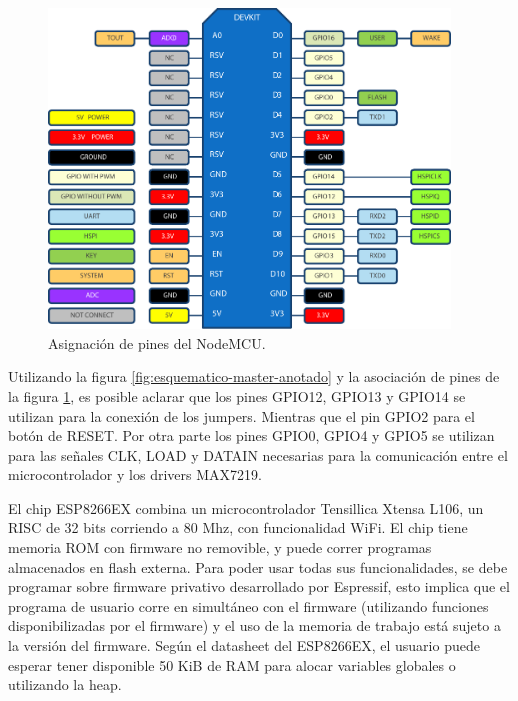 \begin{figure}[ht!]
	\begin{center}
		\includegraphics[width=0.95\textwidth]{imagenes/nodemcu-pinout.pdf}
		\caption{Asignación de pines del NodeMCU.}
		\label{fig:nodemcu-pinout}
	\end{center}
\end{figure}

Utilizando la figura \ref{fig:esquematico-master-anotado} y la asociación de pines de la figura \ref{fig:nodemcu-pinout}, es posible aclarar que los pines GPIO12, GPIO13 y GPIO14 se utilizan para la conexión de los jumpers. Mientras que el pin GPIO2 para el botón de RESET. Por otra parte los pines GPIO0, GPIO4 y GPIO5 se utilizan para las señales CLK, LOAD y DATAIN necesarias para la comunicación entre el microcontrolador y los drivers MAX7219.

El chip ESP8266EX combina un microcontrolador Tensillica Xtensa L106, un RISC de 32 bits corriendo a 80 Mhz, con funcionalidad WiFi. \cite{ESP8266Datasheet} El chip tiene memoria ROM con firmware no removible, y puede correr programas almacenados en flash externa. Para poder usar todas sus funcionalidades, se debe programar sobre firmware privativo desarrollado por Espressif, esto implica que el programa de usuario corre en simultáneo con el firmware (utilizando funciones disponibilizadas por el firmware) y el uso de la memoria de trabajo está sujeto a la versión del firmware. Según el datasheet del ESP8266EX, el usuario puede esperar tener disponible 50 KiB de RAM para alocar variables globales o utilizando la heap.

